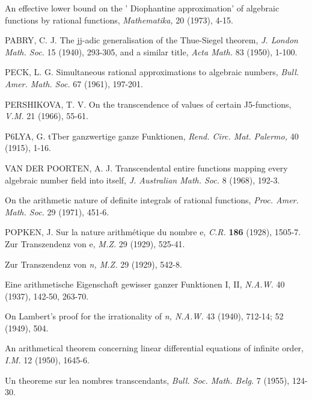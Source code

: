 \begin{hanglist}
    \item \hspace{1.5em} An effective lower bound on the ' Diophantine approximation' of algebraic functions by rational functions, \textit{Mathematika,} 20 (1973), 4-15.
    \item PABRY, C. J. The jj-adic generalisation of the Thue-Siegel theorem, \textit{J. London Math. Soc.} 15 (1940), 293-305, and a similar title, \textit{Acta Math.} 83 (1950), 1-100.
    \item PECK, L. G. Simultaneous rational approximations to algebraic numbers, \textit{Bull. Amer. Math. Soc.} 67 (1961), 197-201.
    \item PERSHIKOVA, T. V. On the transcendence of values of certain J5-functions, \textit{V.M.} 21 (1966), 55-61.
    \item P6LYA, G. tTber ganzwertige ganze Funktionen, \textit{Rend. Circ. Mat. Palermo,} 40 (1915), 1-16.
    \item VAN DER POORTEN, A. J. Transcendental entire functions mapping every algebraic number field into itself, \textit{J. Australian Math. Soc.} 8 (1968), 192-3.
    \item \hspace{1.5em} On the arithmetic nature of definite integrals of rational functions, \textit{Proc. Amer. Math. Soc.} 29 (1971), 451-6.
    \item POPKEN, J. Sur la nature arithmétique du nombre e, \textit{C.R.} \textbf{186} (1928), 1505-7. Zur Transzendenz von e, \textit{M.Z.} 29 (1929), 525-41.
    \item \hspace{1.5em} Zur Transzendenz von \textit{n, M.Z.} 29 (1929), 542-8.
    \item \hspace{1.5em} Eine arithmetische Eigenschaft gewisser ganzer Funktionen I, II, \textit{N.A.W.} 40 (1937), 142-50, 263-70.
    \item \hspace{1.5em} On Lambert's proof for the irrationality of \textit{n, N.A.W.} 43 (1940), 712-14; 52 (1949), 504.
    \item \hspace{1.5em} An arithmetical theorem concerning linear differential equations of infinite order, \textit{I.M.} 12 (1950), 1645-6.
    \item \hspace{1.5em} Un theoreme sur lea nombres transcendants, \textit{Bull. Soc. Math. Belg.} 7 (1955), 124-30.

\end{hanglist}
